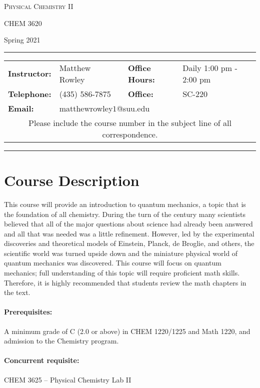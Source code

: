 \documentclass[12pt, letterpaper]{article}
\begin{document}
\begin{center}
{\Large \textsc{Physical Chemistry II}}

CHEM 3620
\end{center}
\begin{center}
{\large Spring 2021}
\end{center}
\begin{center}
\rule{0.85\textwidth}{0.4pt}
\begin{tabular}{llcll}
\textbf{Instructor:} & Matthew Rowley & & \textbf{Office Hours:} & Daily 1:00 pm - 2:00 pm \\
\textbf{Telephone:} & (435) 586-7875 & & \textbf{Office:} & SC-220 \\
\textbf{Email:} & \multicolumn{3}{l}{matthewrowley$1$@suu.edu}\\
\multicolumn{5}{c}{Please include the course number in the subject line of all correspondence.} 
\end{tabular}
\rule{0.85\textwidth}{0.4pt}
\end{center}

\section*{Course Description} 
This course will provide an introduction to quantum mechanics, a topic that is the foundation of all chemistry. During the turn of the  century many scientists believed that all of the major questions about science had already been answered and all that was needed was a little refinement. However, led by the experimental discoveries and theoretical models of Einstein, Planck, de Broglie, and others, the scientific world was turned upside down and the miniature physical world of quantum mechanics was discovered. This course will focus on quantum mechanics; full understanding of this topic will require proficient math skills. Therefore, it is highly recommended that students review the math chapters in the text.

\paragraph{Prerequisites:}
A minimum grade of C (2.0 or above) in CHEM 1220/1225 and Math 1220, and admission to the Chemistry program.

\paragraph{Concurrent requisite:}
CHEM 3625 -- Physical Chemistry Lab II
\end{document}
